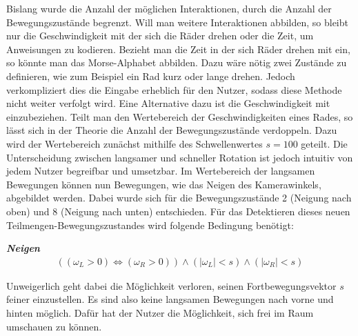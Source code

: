 Bislang wurde die Anzahl der möglichen Interaktionen, durch die Anzahl der Bewegungszustände begrenzt.
Will man weitere Interaktionen abbilden, so bleibt nur die Geschwindigkeit mit der sich die Räder drehen oder die Zeit, um Anweisungen zu kodieren.
Bezieht man die Zeit in der sich Räder drehen mit ein, so könnte man das Morse-Alphabet abbilden. Dazu wäre nötig zwei Zustände zu definieren, wie zum Beispiel ein Rad kurz oder lange drehen.
Jedoch verkompliziert dies die Eingabe erheblich für den Nutzer, sodass diese Methode nicht weiter verfolgt wird.
Eine Alternative dazu ist die Geschwindigkeit mit einzubeziehen.
Teilt man den Wertebereich der Geschwindigkeiten eines Rades, so lässt sich in der Theorie die Anzahl der Bewegungszustände verdoppeln.
Dazu wird der Wertebereich zunächst mithilfe des Schwellenwertes $s = 100$ geteilt.
Die Unterscheidung zwischen langsamer und schneller Rotation ist jedoch intuitiv von jedem Nutzer begreifbar und umsetzbar.
Im Wertebereich der langsamen Bewegungen können nun Bewegungen, wie das Neigen des Kamerawinkels, abgebildet werden.
Dabei wurde sich für die Bewegungszustände 2 (Neigung nach oben) und 8 (Neigung nach unten) entschieden.
Für das Detektieren dieses neuen Teilmengen-Bewegungszustandes wird folgende Bedingung benötigt:

\textbf{\textit{Neigen}}
\begin{align}
    ((\omega_L > 0) \Leftrightarrow (\omega_R > 0))  \land (|\omega_L| < s) \land (|\omega_R| < s)
\end{align}

Unweigerlich geht dabei die Möglichkeit verloren, seinen Fortbewegungsvektor $s$ feiner einzustellen.
Es sind also keine langsamen Bewegungen nach vorne und hinten möglich.
Dafür hat der Nutzer die Möglichkeit, sich frei im Raum umschauen zu können.

